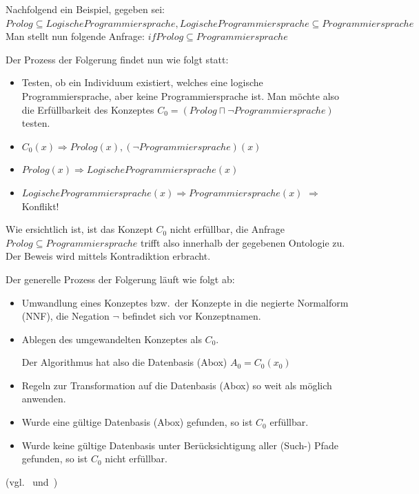 Nachfolgend ein Beispiel, gegeben sei:
$ Prolog \subseteq LogischeProgrammiersprache, LogischeProgrammiersprache \subseteq Programmiersprache $
Man stellt nun folgende Anfrage:
$ if Prolog \subseteq Programmiersprache $

Der Prozess der Folgerung findet nun wie folgt statt:
\begin{itemize}
    \item Testen, ob ein Individuum existiert, welches eine logische Programmiersprache, aber keine Programmiersprache ist. Man möchte also die Erfüllbarkeit des Konzeptes $ C_0 = (Prolog \sqcap \neg Programmiersprache) $ testen.
    \item $ C_0(x) \Rightarrow Prolog(x), (\neg Programmiersprache)(x) $
    \item $ Prolog(x) \Rightarrow LogischeProgrammiersprache(x) $
    \item $ LogischeProgrammiersprache(x) \Rightarrow Programmiersprache(x) $
        $ \Rightarrow $ Konflikt!
\end{itemize}
Wie ersichtlich ist, ist das Konzept $ C_0 $ nicht erfüllbar, die Anfrage $ Prolog \subseteq Programmiersprache $ trifft also innerhalb der gegebenen Ontologie zu. Der Beweis wird mittels Kontradiktion erbracht.

Der generelle Prozess der Folgerung läuft wie folgt ab:
\begin{itemize}
    \item Umwandlung eines Konzeptes bzw.\ der Konzepte in die negierte Normalform (NNF), die Negation $ \neg $ befindet sich vor Konzeptnamen.
    \item Ablegen des umgewandelten Konzeptes als $ C_0 $.

        Der Algorithmus hat also die Datenbasis (Abox) $ A_0 = {C_0(x_0)} $
    \item Regeln zur Transformation auf die Datenbasis (Abox) so weit als möglich anwenden.
    \item Wurde eine gültige Datenbasis (Abox) gefunden, so ist $ C_0 $ erfüllbar.
    \item Wurde keine gültige Datenbasis unter Berücksichtigung aller (Such-) Pfade gefunden, so ist $ C_0 $ nicht erfüllbar.
\end{itemize} (vgl.~\cite{horrocks2002} und~\cite{horrocks2005})

